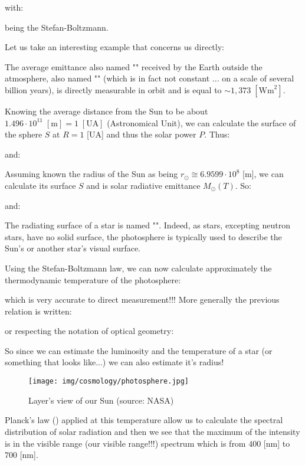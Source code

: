 	with:
	
	being the Stefan-Boltzmann.

	Let us take an interesting example that concerns us directly:
	
	The average emittance also named "" received by the Earth outside the atmosphere, also named "" (which is in fact not constant ... on a scale of several billion years), is directly measurable in orbit and is equal to $\sim 1,373\;[\text{Wm}^2]$.
	
	Knowing the average distance from the Sun to be about $1.496\cdot 10^{11}\;[\text{m}]=1\;[\text{UA}]$  (Astronomical Unit), we can calculate the surface of the sphere $S$ at $R=1$ [UA] and thus the solar power $P$. Thus:
	
	and:
	
	Assuming known the radius of the Sun as being $r_{\odot}\cong 6.9599\cdot 10^8$ [m], we can calculate its surface $S$ and is solar radiative emittance $M_{\odot}(T)$. So:
	
	and:
	
	\begin{tcolorbox}[title=Remark,colframe=black,arc=10pt]
	The radiating surface of a star is named "". Indeed, as stars, excepting neutron stars, have no solid surface, the photosphere is typically used to describe the Sun's or another star's visual surface.
	\end{tcolorbox}
	Using the Stefan-Boltzmann law, we can now calculate approximately the thermodynamic temperature of the photosphere:
	
	which is very accurate to direct measurement!!! More generally the previous relation is written:
	
	or respecting the notation of optical geometry:
	
	So since we can estimate the luminosity and the temperature of a star (or something that looks like...) we can also estimate it's radius!
	\begin{figure}[H]
		\begin{center}
		\texttt{[image: img/cosmology/photosphere.jpg]}
		\end{center}	
		\caption[Layer's view of our Sun]{Layer's view of our Sun (source: NASA)}
	\end{figure}

	Planck's law () applied at this temperature allow us to calculate the spectral distribution of solar radiation and then we see that the maximum of the intensity is in the visible range (our visible range!!!) spectrum which is from $400$ [nm] to $700$ [nm].
	
